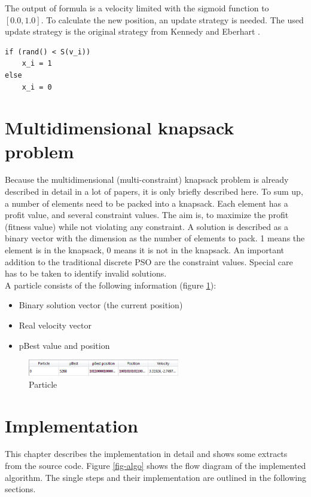\documentclass{article}
\begin{document}
The output of formula is a velocity limited with the sigmoid function to $[0.0, 1.0]$. To calculate the new position, an update strategy is needed. The used update strategy is the original strategy from Kennedy and Eberhart \cite{bib-discrete}.
\begin{lstlisting}
if (rand() < S(v_i))
	x_i = 1
else
	x_i = 0
\end{lstlisting}

\section{Multidimensional knapsack problem}
\label{lbl-mknap}
Because the multidimensional (multi-constraint) knapsack problem is already described in detail in a lot of papers, it is only briefly described here. To sum up, a number of elements need to be packed into a knapsack. Each element has a profit value, and several constraint values. The aim is, to maximize the profit (fitness value) while not violating any constraint. A solution is described as a binary vector with the dimension as the number of elements to pack. 1 means the element is in the knapsack, 0 means it is not in the knapsack. An important addition to the traditional discrete PSO are the constraint values. Special care has to be taken to identify invalid solutions.\\

A particle consists of the following information (figure \ref{fig-particle}):
\begin{itemize}
\item Binary solution vector (the current position)
\item Real velocity vector
\item pBest value and position
\end{itemize}

\begin{figure}[H]
    \centering
    \includegraphics[width=250px]{images/particle.PNG}
    \caption{Particle}
    \label{fig-particle}
\end{figure}

\section{Implementation}
\label{lbl-impl}
This chapter describes the implementation in detail and shows some extracts from the source code. Figure \ref{fig-algo} shows the flow diagram of the implemented algorithm. The single steps and their implementation are outlined in the following sections.
\end{document}

